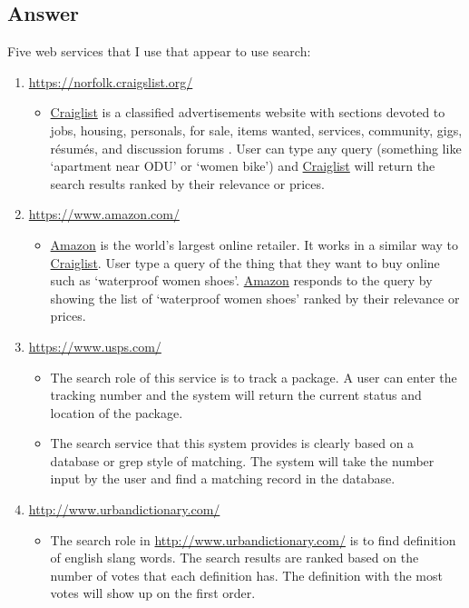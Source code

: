 \documentclass[letterpaper,11pt]{article}
\begin{document}
\subsection*{Answer}
Five web services that I use that appear to use search:
\begin{enumerate}
	\item \url{https://norfolk.craigslist.org/}
		\begin{itemize}
			\item \href{https://norfolk.craigslist.org/}{Craiglist} is a classified advertisements website with sections devoted to jobs, housing, personals, for sale, items wanted, services, community, gigs, résumés, and discussion forums \cite{craigslist}. User can type any query (something like `apartment near ODU' or `women bike') and \href{https://norfolk.craigslist.org/}{Craiglist} will return the search results ranked by their relevance or prices. 
		\end{itemize}
	\item \url{https://www.amazon.com/} 
		\begin{itemize}
			\item \href{https://www.amazon.com/}{Amazon} is the world's largest online retailer. It works in a similar way to \href{https://norfolk.craigslist.org/}{Craiglist}. User type a query of the thing that they want to buy online such as `waterproof women shoes'. \href{https://www.amazon.com/}{Amazon} responds to the query by showing the list of `waterproof women shoes' ranked by their relevance or prices. 
		\end{itemize}
	\item \url{https://www.usps.com/}
		\begin{itemize}
			\item The search role of this service is to track a package. A user can enter the tracking number and the system will return the current status and location of the package. 
			\item The search service that this system provides is clearly based on a database or grep style of matching. The system will take the number input by the user and find a matching record in the database. 
		\end{itemize}
	\item \url{http://www.urbandictionary.com/}
		\begin{itemize}
			\item The search role in \url{http://www.urbandictionary.com/} is to find definition of english slang words. The search results are ranked based on the number of votes that each definition has. The definition with the most votes will show up on the first order. 

\end{itemize}
\end{enumerate}
\end{document}
